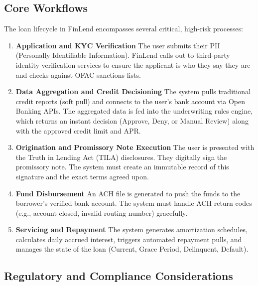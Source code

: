 \subsection{Core Workflows}\label{core-workflows-1}

The loan lifecycle in FinLend encompasses several critical, high-risk
processes:

\begin{enumerate}
\def\labelenumi{\arabic{enumi}.}
\item
  \textbf{Application and KYC Verification} The user submits their PII
  (Personally Identifiable Information). FinLend calls out to
  third-party identity verification services to ensure the applicant is
  who they say they are and checks against OFAC sanctions lists.
\item
  \textbf{Data Aggregation and Credit Decisioning} The system pulls
  traditional credit reports (soft pull) and connects to the user's bank
  account via Open Banking APIs. The aggregated data is fed into the
  underwriting rules engine, which returns an instant decision (Approve,
  Deny, or Manual Review) along with the approved credit limit and APR.
\item
  \textbf{Origination and Promissory Note Execution} The user is
  presented with the Truth in Lending Act (TILA) disclosures. They
  digitally sign the promissory note. The system must create an
  immutable record of this signature and the exact terms agreed upon.
\item
  \textbf{Fund Disbursement} An ACH file is generated to push the funds
  to the borrower's verified bank account. The system must handle ACH
  return codes (e.g., account closed, invalid routing number)
  gracefully.
\item
  \textbf{Servicing and Repayment} The system generates amortization
  schedules, calculates daily accrued interest, triggers automated
  repayment pulls, and manages the state of the loan (Current, Grace
  Period, Delinquent, Default).
\end{enumerate}

\subsection{Regulatory and Compliance
Considerations}\label{regulatory-and-compliance-considerations-1}


